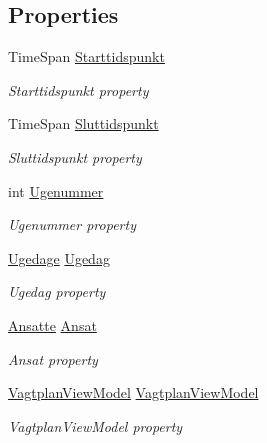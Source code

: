\subsection*{Properties}
\begin{DoxyCompactItemize}
\item 
Time\+Span \hyperlink{class__1aarsproeve_1_1_handler_1_1_vagt_handler_a56bffa0b024e4725e2c8b792dc6a9fa9}{Starttidspunkt}
\begin{DoxyCompactList}\small\item\em Starttidspunkt property \end{DoxyCompactList}\item 
Time\+Span \hyperlink{class__1aarsproeve_1_1_handler_1_1_vagt_handler_a7013671696e6169e7408a4fd1b2304c0}{Sluttidspunkt}
\begin{DoxyCompactList}\small\item\em Sluttidspunkt property \end{DoxyCompactList}\item 
int \hyperlink{class__1aarsproeve_1_1_handler_1_1_vagt_handler_a1ba62aedc8333e3b5889d3ffa8132a4c}{Ugenummer}
\begin{DoxyCompactList}\small\item\em Ugenummer property \end{DoxyCompactList}\item 
\hyperlink{class__1aarsproeve_1_1_model_1_1_ugedage}{Ugedage} \hyperlink{class__1aarsproeve_1_1_handler_1_1_vagt_handler_a97b98aef44c9aa2dfa598d14a9fc7813}{Ugedag}
\begin{DoxyCompactList}\small\item\em Ugedag property \end{DoxyCompactList}\item 
\hyperlink{class__1aarsproeve_1_1_model_1_1_ansatte}{Ansatte} \hyperlink{class__1aarsproeve_1_1_handler_1_1_vagt_handler_aaada027289c61a5e923bd2d0ff59db09}{Ansat}
\begin{DoxyCompactList}\small\item\em Ansat property \end{DoxyCompactList}\item 
\hyperlink{class__1aarsproeve_1_1_view_model_1_1_vagtplan_view_model}{Vagtplan\+View\+Model} \hyperlink{class__1aarsproeve_1_1_handler_1_1_vagt_handler_ac7a38ad84077edb90a6dc695e05c756e}{Vagtplan\+View\+Model}
\begin{DoxyCompactList}\small\item\em Vagtplan\+View\+Model property \end{DoxyCompactList}\end{DoxyCompactItemize}


